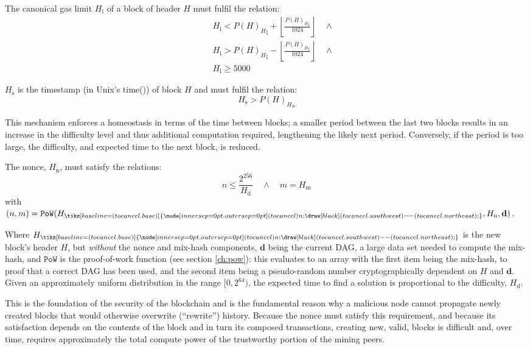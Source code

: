 \documentclass[9pt,oneside]{amsart}
\newcommand{\hcancel}[1]{%
    \tikz[baseline=(tocancel.base)]{
        \node[inner sep=0pt,outer sep=0pt] (tocancel) {#1};
        \draw[black] (tocancel.south west) -- (tocancel.north east);
    }%
}%
\begin{document}
\begin{multicols}{2}
\hypertarget{block_gas_limit_H__l}{}The canonical gas limit $H_{\mathrm{l}}$ of a block of header $H$ must fulfil the relation:
\begin{eqnarray}
& & H_{\mathrm{l}} < {P(H)_{H}}_{\mathrm{l}} + \left\lfloor\frac{{P(H)_{H}}_{\mathrm{l}}}{1024}\right\rfloor \quad \wedge \\
& & H_{\mathrm{l}} > {P(H)_{H}}_{\mathrm{l}} - \left\lfloor\frac{{P(H)_{H}}_{\mathrm{l}}}{1024}\right\rfloor \quad \wedge \\
& & H_{\mathrm{l}} \geqslant 5000
\end{eqnarray}

\hypertarget{block_timestamp_H__s}{}$H_{\mathrm{s}}$ is the timestamp (in Unix's time()) of block $H$ and must fulfil the relation:
\begin{equation}
H_{\mathrm{s}} > {P(H)_{H}}_{\mathrm{s}}
\end{equation}

This mechanism enforces a homeostasis in terms of the time between blocks; a smaller period between the last two blocks results in an increase in the difficulty level and thus additional computation required, lengthening the likely next period. Conversely, if the period is too large, the difficulty, and expected time to the next block, is reduced.

The nonce, \hyperlink{block_nonce_H__n}{$H_{\mathrm{n}}$}, must satisfy the relations:
\begin{equation}
n \leqslant \frac{2^{256}}{H_{\mathrm{d}}} \quad \wedge \quad m = H_{\mathrm{m}}
\end{equation}
with $(n, m) = \mathtt{PoW}(H_{\hcancel{n}}, H_{\mathrm{n}}, \mathbf{d})$.

\hypertarget{block_header_without_nonce_and_mixmash_h__cancel_n}{}Where $H_{\hcancel{n}}$ is the new block's header $H$, but \textit{without} the nonce and mix-hash components, $\mathbf{d}$ being the current DAG, a large data set needed to compute the mix-hash, and $\mathtt{PoW}$ is the proof-of-work function (see section \ref{ch:pow}): this evaluates to an array with the first item being the mix-hash, to proof that a correct DAG has been used, and the second item being a pseudo-random number cryptographically dependent on $H$ and $\mathbf{d}$. Given an approximately uniform distribution in the range $[0, 2^{64})$, the expected time to find a solution is proportional to the difficulty, $H_{\mathrm{d}}$.

This is the foundation of the security of the blockchain and is the fundamental reason why a malicious node cannot propagate newly created blocks that would otherwise overwrite (``rewrite'') history. Because the nonce must satisfy this requirement, and because its satisfaction depends on the contents of the block and in turn its composed transactions, creating new, valid, blocks is difficult and, over time, requires approximately the total compute power of the trustworthy portion of the mining peers.


\end{multicols}
\end{document}
